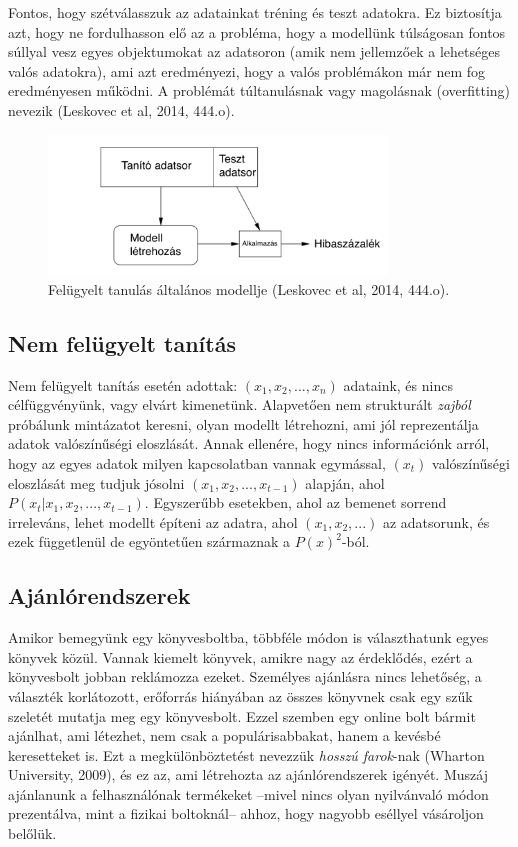 \documentclass[a4paper,12pt]{article}
\begin{document}
Fontos, hogy szétválasszuk az adatainkat tréning és teszt adatokra. Ez biztosítja azt, hogy ne fordulhasson elő az a probléma, hogy a modellünk túlságosan fontos súllyal vesz egyes objektumokat az adatsoron (amik nem jellemzőek a lehetséges valós adatokra), ami azt eredményezi, hogy a valós problémákon már nem fog eredményesen működni. A problémát túltanulásnak vagy magolásnak (overfitting) nevezik (Leskovec et al, 2014, 444.o).



\begin{figure}[ht!]
\centering
\includegraphics[width=90mm]{img/ml.png}
\caption{Felügyelt tanulás általános modellje (Leskovec et al, 2014, 444.o).} \label{ml}
\end{figure}

\subsection{Nem felügyelt tanítás}
Nem felügyelt tanítás esetén adottak: $(x_1, x_2, ..., x_n)$ adataink, és nincs célfüggvényünk, vagy elvárt kimenetünk. Alapvetően nem strukturált \textsl{zajból} próbálunk mintázatot keresni, olyan modellt létrehozni, ami jól reprezentálja adatok valószínűségi eloszlását. Annak ellenére, hogy nincs információnk arról, hogy az egyes adatok milyen kapcsolatban vannak egymással, $(x_t)$ valószínűségi eloszlását meg tudjuk jósolni  $(x_1,x_2, ..., x_{t-1})$ alapján, ahol $P(x_t|x_1,x_2, ..., x_{t-1})$.
Egyszerűbb esetekben, ahol az bemenet sorrend irreleváns, lehet modellt építeni az adatra, ahol $(x_1, x_2, ...)$ az adatsorunk, és ezek függetlenül de egyöntetűen származnak a $P(x)^2$-ból.\cite{unsupervised}

\subsection{Ajánlórendszerek}
Amikor bemegyünk egy könyvesboltba, többféle módon is választhatunk egyes könyvek közül. Vannak kiemelt könyvek, amikre nagy az érdeklődés, ezért a könyvesbolt jobban reklámozza ezeket. Személyes ajánlásra nincs lehetőség, a választék korlátozott, erőforrás hiányában az összes könyvnek csak egy szűk szeletét mutatja meg egy könyvesbolt. Ezzel szemben egy online bolt bármit ajánlhat, ami létezhet, nem csak a populárisabbakat, hanem a kevésbé keresetteket is. Ezt a megkülönböztetést nevezzük \textsl{hosszú farok}-nak (Wharton University, 2009), és ez az, ami létrehozta az ajánlórendszerek igényét. Muszáj ajánlanunk a felhasználónak termékeket --mivel nincs olyan nyilvánvaló módon prezentálva, mint a fizikai boltoknál-- ahhoz, hogy nagyobb eséllyel vásároljon belőlük. \newline
\end{document}
